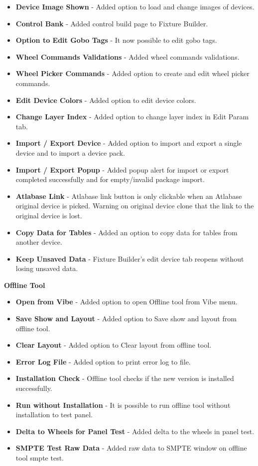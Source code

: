 \documentclass[
]{article}
\begin{document}
\begin{itemize}
\item
  \textbf{Device Image Shown} - Added option to load and change images of devices.
\item
  \textbf{Control Bank} - Added control build page to Fixture Builder.
\item
  \textbf{Option to Edit Gobo Tags} - It now possible to edit gobo tags.
\item
  \textbf{Wheel Commands Validations} - Added wheel commands validations.
\item
  \textbf{Wheel Picker Commands} - Added option to create and edit wheel picker commands.
\item
  \textbf{Edit Device Colors} - Added option to edit device colors.
\item
  \textbf{Change Layer Index} - Added option to change layer index in Edit Param tab.
\item
  \textbf{Import / Export Device} - Added option to import and export a single device and to import a device pack.
\item
  \textbf{Import / Export Popup} - Added popup alert for import or export completed successfully and for empty/invalid package import.
\item
  \textbf{Atlabase Link} - Atlabase link button is only clickable when an Atlabase original device is picked. Warning on original device clone that the link to the original device is lost.
\item
  \textbf{Copy Data for Tables} - Added an option to copy data for tables from another device.
\item
  \textbf{Keep Unsaved Data} - Fixture Builder's edit device tab reopens without losing unsaved data.
\end{itemize}

\textbf{Offline Tool}

\begin{itemize}
\item
  \textbf{Open from Vibe} - Added option to open Offline tool from Vibe menu.
\item
  \textbf{Save Show and Layout} - Added option to Save show and layout from offline tool.
\item
  \textbf{Clear Layout} - Added option to Clear layout from offline tool.
\item
  \textbf{Error Log File} - Added option to print error log to file.
\item
  \textbf{Installation Check} - Offline tool checks if the new version is installed successfully.
\item
  \textbf{Run without Installation} - It is possible to run offline tool without installation to test panel.
\item
  \textbf{Delta to Wheels for Panel Test} - Added delta to the wheels in panel test.
\item
  \textbf{SMPTE Test Raw Data} - Added raw data to SMPTE window on offline tool smpte test.
\end{itemize}
\end{document}
